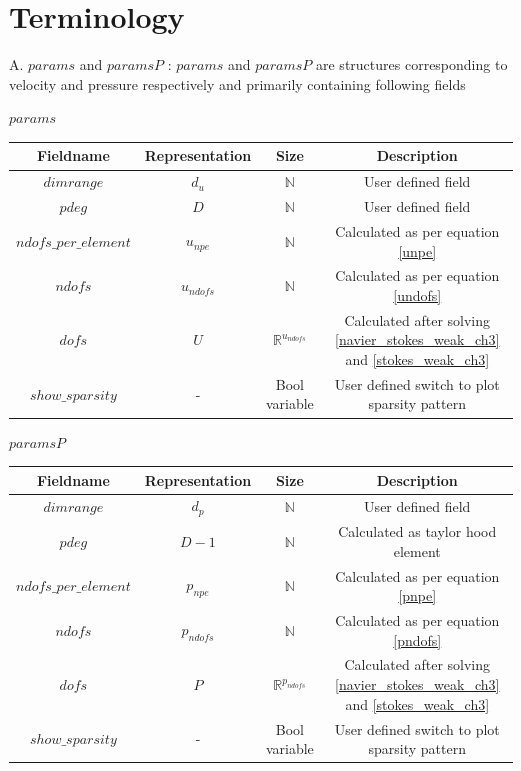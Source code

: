 \documentclass[a4paper,12pt]{book}
\begin{document}
\section{Terminology}


A. $params$ and $paramsP$ : $params$ and $paramsP$ are structures corresponding to velocity and pressure respectively and primarily containing following fields
\begin{center}
$params$\\
\begin{tabular}{|c|c|c|c|}
\hline
\textbf{Fieldname} & \textbf{Representation} & \textbf{Size} & \textbf{Description}\\
\hline
$dimrange$ & $d_u$ & $\mathbb{N}$ & User defined field\\
\hline
$pdeg$ & $D$ & $\mathbb{N}$ & User defined field\\
\hline
$ndofs\_per\_element$ & $u_{npe}$ & $\mathbb{N}$ & Calculated as per equation \ref{unpe}\\
\hline
$ndofs$ & $u_{ndofs}$ & $\mathbb{N}$ & Calculated as per equation \ref{undofs}\\
\hline
$dofs$ & $U$ & $\mathbb{R}^{u_{ndofs}}$ & Calculated after solving \ref{navier_stokes_weak_ch3} and \ref{stokes_weak_ch3}\\
\hline
$show\_sparsity$ & - & Bool variable & User defined switch to plot sparsity pattern\\
\hline
\end{tabular}
\end{center}
\begin{center}
$paramsP$\\
\begin{tabular}{|c|c|c|c|}
\hline
\textbf{Fieldname} & \textbf{Representation} & \textbf{Size} & \textbf{Description}\\
\hline
$dimrange$ & $d_p$ & $\mathbb{N}$ & User defined field\\
\hline
$pdeg$ & $D-1$ & $\mathbb{N}$ & Calculated as taylor hood element\\
\hline
$ndofs\_per\_element$ & $p_{npe}$ & $\mathbb{N}$ & Calculated as per equation \ref{pnpe}\\
\hline
$ndofs$ & $p_{ndofs}$ & $\mathbb{N}$ & Calculated as per equation \ref{pndofs}\\
\hline
$dofs$ & $P$ & $\mathbb{R}^{p_{ndofs}}$ & Calculated after solving \ref{navier_stokes_weak_ch3} and \ref{stokes_weak_ch3}\\
\hline
$show\_sparsity$ & - & Bool variable & User defined switch to plot sparsity pattern\\
\hline
\end{tabular}
\end{center}
\end{document}
